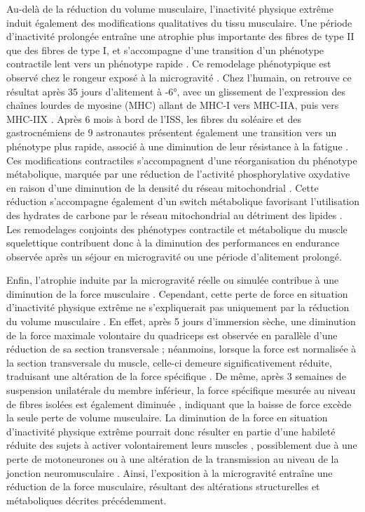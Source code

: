 \documentclass[11pt]{report}
\begin{document}
Au-delà de la réduction du volume musculaire, l'inactivité physique extrême induit également des modifications qualitatives du tissu musculaire. Une période d'inactivité prolongée entraîne une atrophie plus importante des fibres de type II que des fibres de type I, et s'accompagne d'une transition d'un phénotype contractile lent vers un phénotype rapide \parencite{vikne_human_2020}. Ce remodelage phénotypique est observé chez le rongeur exposé à la microgravité \parencite{Sandona2012}. Chez l'humain, on retrouve ce résultat après 35 jours d'alitement à -6°, avec un glissement de l'expression des chaînes lourdes de myosine (MHC) allant de MHC-I vers MHC-IIA, puis vers MHC-IIX \parencite{borina_myosin_2010}. Après 6 mois à bord de l'ISS, les fibres du soléaire et des gastrocnémiens de 9 astronautes présentent également une transition vers un phénotype plus rapide, associé à une diminution de leur résistance à la fatigue \parencite{Trappe2009Apr}. Ces modifications contractiles s'accompagnent d'une réorganisation du phénotype métabolique, marquée par une réduction de l'activité phosphorylative oxydative en raison d'une diminution de la densité du réseau mitochondrial \parencite{Eggelbusch2024Jan}. Cette réduction s'accompagne également d'un switch métabolique favorisant l'utilisation des hydrates de carbone par le réseau mitochondrial au détriment des lipides \parencite{Fitts2001Sep,bergouignan_physical_2011}. Les remodelages conjoints des phénotypes contractile et métabolique du muscle squelettique contribuent donc à la diminution des performances en endurance observée après un séjour en microgravité ou une période d'alitement prolongé.

Enfin, l'atrophie induite par la microgravité réelle ou simulée contribue à une diminution de la force musculaire \parencite{adams_skeletal_2003, Fitts2010Sep}. Cependant, cette perte de force en situation d'inactivité physique extrême ne s'expliquerait pas uniquement par la réduction du volume musculaire \parencite{Marusic2021Jul,bosutti_microgravity-induced_2025}. En effet, après 5 jours d'immersion sèche, une diminution de la force maximale volontaire du quadriceps est observée en parallèle d'une réduction de sa section transversale ; néanmoins, lorsque la force est normalisée à la section transversale du muscle, celle-ci demeure significativement réduite, traduisant une altération de la force spécifique \parencite{velarde_molecular_2024}. De même, après 3 semaines de suspension unilatérale du membre inférieur, la force spécifique mesurée au niveau de fibres isolées est également diminuée \parencite{Brocca2015Dec}, indiquant que la baisse de force excède la seule perte de volume musculaire. La diminution de la force en situation d'inactivité physique extrême pourrait donc résulter en partie d'une habileté réduite des sujets à activer volontairement leurs muscles \parencite{Kawakami2001Jan}, possiblement due à une perte de motoneurones ou à une altération de la transmission au niveau de la jonction neuromusculaire \parencite{bosutti_microgravity-induced_2025}. Ainsi, l'exposition à la microgravité entraîne une réduction de la force musculaire, résultant des altérations structurelles et métaboliques décrites précédemment.
\end{document}
